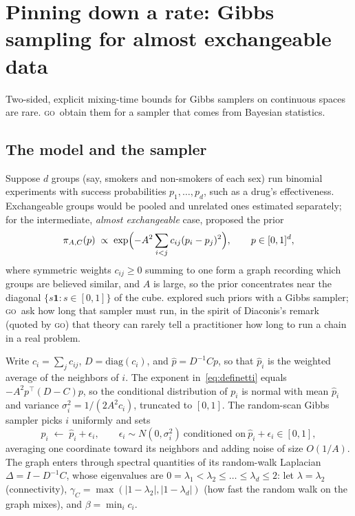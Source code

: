 \documentclass[11pt]{article}
\theoremstyle{remark}
\newcommand{\GO}{\textsc{go}}
\begin{document}
\section{Pinning down a rate: Gibbs sampling for almost exchangeable data}\label{sec:go}

Two-sided, explicit mixing-time bounds for Gibbs samplers on continuous spaces are rare. \GO\ obtain them for a sampler that comes from Bayesian statistics.

\subsection{The model and the sampler}
Suppose $d$ groups (say, smokers and non-smokers of each sex) run binomial experiments with success probabilities $p_1,\dots,p_d$, such as a drug's effectiveness. Exchangeable groups would be pooled and unrelated ones estimated separately; for the intermediate, \emph{almost exchangeable} case, \citet{definetti1972} proposed the prior
\begin{equation}\label{eq:definetti}
\pi_{A,C}(p)\;\propto\;\exp\Bigl(-A^2\sum_{i<j}c_{ij}(p_i-p_j)^2\Bigr),\qquad p\in[0,1]^d,
\end{equation}
where symmetric weights $c_{ij}\ge0$ summing to one form a graph recording which groups are believed similar, and $A$ is large, so the prior concentrates near the diagonal $\{s\mathbf 1:s\in[0,1]\}$ of the cube. \citet{bacallado2015} explored such priors with a Gibbs sampler; \GO\ ask how long that sampler must run, in the spirit of Diaconis's remark (quoted by \GO) that theory can rarely tell a practitioner how long to run a chain in a real problem.

Write $c_i=\sum_jc_{ij}$, $D=\mathrm{diag}(c_i)$, and $\hat p=D^{-1}Cp$, so that $\hat p_i$ is the weighted average of the neighbors of $i$. The exponent in~\eqref{eq:definetti} equals $-A^2p^\top(D-C)p$, so the conditional distribution of $p_i$ is normal with mean $\hat p_i$ and variance $\sigma_i^2=1/(2A^2c_i)$, truncated to $[0,1]$. The random-scan Gibbs sampler picks $i$ uniformly and sets
\[
p_i\;\leftarrow\;\hat p_i+\epsilon_i,\qquad\epsilon_i\sim N(0,\sigma_i^2)\ \text{conditioned on}\ \hat p_i+\epsilon_i\in[0,1],
\]
averaging one coordinate toward its neighbors and adding noise of size $O(1/A)$. The graph enters through spectral quantities of its random-walk Laplacian $\Delta=I-D^{-1}C$, whose eigenvalues are $0=\lambda_1<\lambda_2\le\dots\le\lambda_d\le2$: let $\lambda=\lambda_2$ (connectivity), $\gamma_C=\max(|1-\lambda_2|,|1-\lambda_d|)$ (how fast the random walk on the graph mixes), and $\beta=\min_ic_i$.
\end{document}
